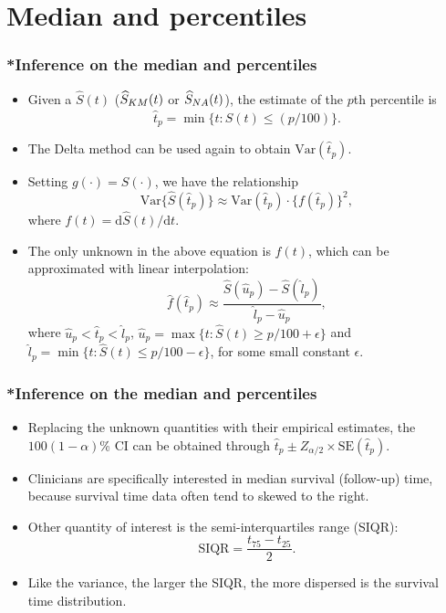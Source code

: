 \documentclass[10pt]{beamer}\usepackage[]{graphicx}\usepackage[]{color}
\newcommand{\dif}{\mathrm{d}}
\newcommand{\tp}{\hat t_p}
\newcommand{\Var}{\mathrm{Var}}
\newcommand{\SE}{\mathrm{SE}}
\newcommand{\Ss}{\widehat{S}}
\newcommand{\Skm}{\widehat{S}_{\scriptsize{KM}}}
\newcommand{\Sna}{\widehat{S}_{\scriptsize{NA}}}
\begin{document}
\section{Median and percentiles}
\begin{frame}
  \frametitle{*Inference on the median and percentiles}
  \begin{itemize}
  \item Given a $\Ss(t)$ ($\Skm(t)$ or $\Sna(t)$), the estimate of the $p$th percentile is 
    $$ \tp = \min\{t: \hat{S}(t) \le (p / 100)\}.$$
  \item The Delta method can be used again to obtain $\Var(\tp)$.
  \item Setting $g(\cdot) = S(\cdot)$, we have the relationship
    \begin{equation*}
    \Var\{\Ss(\tp)\} \approx \Var(\tp) \cdot \{f(\tp)\}^2,
    \label{eq:mp}
    \end{equation*}
    where $f(t) = \dif \Ss(t) / \dif t$.
  \item The only unknown in the above equation is $f(t)$, 
    which can be approximated with linear interpolation:
    $$\hat f(\tp) \approx\frac{\Ss(\hat u_p) - \Ss(\hat l_p)}{\hat l_p - \hat u_p}, $$
    where $\hat u_p < \tp < \hat l_p$, $\hat u_p = \max\{t:\Ss(t) \ge p / 100 + \epsilon\}$ and 
    $\hat l_p = \min\{t:\Ss(t) \le p / 100 - \epsilon\}$, for some small constant $\epsilon$.
  \end{itemize}
\end{frame}

\begin{frame}[fragile]
  \frametitle{*Inference on the median and percentiles}
  \begin{itemize}
  \item Replacing the unknown quantities with their empirical estimates, 
    the $100(1-\alpha)$\% CI can be obtained through
    $\tp \pm Z_{\alpha/2}\times\SE(\tp)$.
  \item Clinicians are specifically interested in median survival (follow-up) time, 
    because survival time data often tend to skewed to the right.
  \item Other quantity of interest is the semi-interquartiles range (SIQR):
    $$\mbox{SIQR} = \frac{t_{75} - t_{25}}{2}.$$
  \item Like the variance, the larger the SIQR, the more dispersed is the survival time distribution.
  \end{itemize}
\end{frame}
\end{document}

